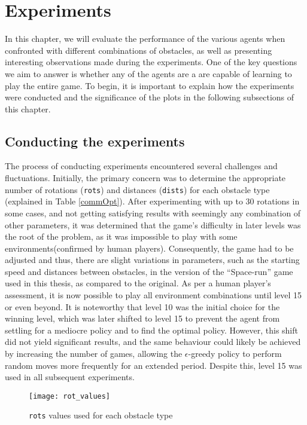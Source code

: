 \chapter{Experiments}
\label{experiments_chapter}
In this chapter, we will evaluate the performance of the various agents when
confronted with different combinations of obstacles, as well as presenting interesting observations made during the experiments. One of the key questions we aim to answer is whether any of the agents are a are capable of learning to play the entire game. To begin, it is important to explain how the experiments were conducted and the significance of the plots in the following subsections of this chapter.

\section{Conducting the experiments}
The process of conducting experiments encountered several challenges and fluctuations. Initially, the primary concern was to determine the appropriate number of rotations (\texttt{rots}) and distances (\texttt{dists}) for each obstacle type (explained in Table \ref{commOpt}). After experimenting with up to 30 rotations in some cases, and not getting satisfying results with seemingly any combination of other parameters, it was determined that the game's difficulty in later levels was the root of the problem, as it was impossible to play with some environments(confirmed by human players). Consequently, the game had to be adjusted and thus, there are slight variations in parameters, such as the starting speed and distances between obstacles, in the version of the ``Space-run'' game used in this thesis, as compared to the original. As per a human player's assessment, it is now possible to play all environment combinations until level 15 or even beyond. It is noteworthy that level 10 was the initial choice for the winning level, which was later shifted to level 15 to prevent the agent from settling for a mediocre policy and to find the optimal policy. However, this shift did not yield significant results, and the same behaviour could likely be achieved by increasing the number of games, allowing the $\epsilon$-greedy policy to perform random moves more frequently for an extended period. Despite this, level 15 was used in all subsequent experiments.

\begin{figure}[h]
    \centering
    \texttt{[image: rot\_values]}
    \caption{\texttt{rots} values used for each obstacle type}
    \label{fig:rot_values}
\end{figure}

